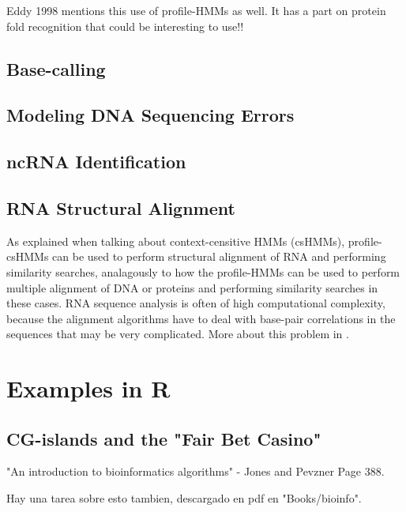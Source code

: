 \documentclass{article}
\begin{document}
Eddy 1998 mentions this use of profile-HMMs as well. It has a part on protein fold recognition that could be interesting to use!!

\subsection{Base-calling}
\cite{Yoon2009}
\subsection{Modeling DNA Sequencing Errors}
\cite{Yoon2009}
\subsection{ncRNA Identification}
\cite{Yoon2009}
\subsection{RNA Structural Alignment}
As explained when talking about context-censitive HMMs (csHMMs), profile-csHMMs can be used to perform structural alignment of RNA and performing similarity searches, analagously to how the profile-HMMs can be used to perform multiple alignment of DNA or proteins and performing similarity searches in these cases. RNA sequence analysis is often of high computational complexity, because the alignment algorithms have to deal with base-pair correlations in the sequences that may be very complicated. More about this problem in \cite{Yoon2009}.

\section{Examples in R}

\subsection{CG-islands and the "Fair Bet Casino"}

"An introduction to bioinformatics algorithms" - Jones and Pevzner Page 388. 

Hay una tarea sobre esto tambien, descargado en pdf en "Books/bioinfo".
\end{document}
